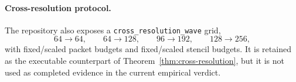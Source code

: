 \paragraph{Cross-resolution protocol.}
\label{sec:cross-resolution-campaign}
The repository also exposes a \texttt{cross\_resolution\_wave} grid,
\[
64\to64,\qquad 64\to128,\qquad 96\to192,\qquad 128\to256,
\]
with fixed/scaled packet budgets and fixed/scaled stencil budgets.  It is retained as the executable counterpart of Theorem~\ref{thm:cross-resolution}, but it is not used as completed evidence in the current empirical verdict.
